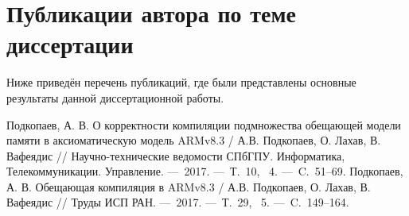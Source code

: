 





\section*{\LARGE Публикации автора по теме диссертации}

Ниже приведён перечень публикаций, где были представлены основные результаты данной  диссертационной работы. \\

\renewcommand{\bibsection}{\noindent \textbf{\refname}}

\renewcommand{\refname}{Статьи из \vakJournals}
\begin{thebibliography}{99}
 Подкопаев, А. В. О корректности компиляции подмножества обещающей модели памяти в аксиоматическую модель ARMv8.3 / А.В. Подкопаев, О. Лахав, В. Вафеядис // Научно-технические ведомости СПбГПУ. Информатика, Телекоммуникации. Управление. ---~2017. ---~Т.~10, \textnumero~4. ---~C.~51--69.
 Подкопаев, А. В. Обещающая компиляция в ARMv8.3 / А.В. Подкопаев, О. Лахав, В. Вафеядис // Труды ИСП РАН. ---~2017. ---~Т.~29, \textnumero~5. ---~C.~149--164.
\setcounter{firstbib}{\value{enumiv}}
\end{thebibliography}

